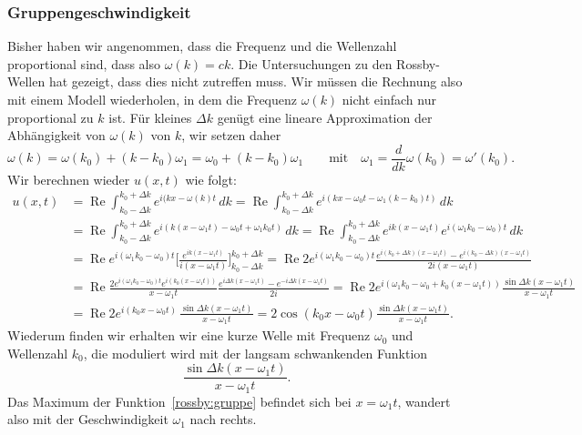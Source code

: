 \subsubsection{Gruppengeschwindigkeit}
%
Bisher haben wir angenommen, dass die Frequenz und die Wellenzahl proportional
sind, dass also $\omega(k)=ck$.
Die Untersuchungen zu den Rossby-Wellen hat gezeigt, dass dies nicht
zutreffen muss.
Wir müssen die Rechnung also mit einem Modell wiederholen, in dem die
Frequenz $\omega(k)$ nicht einfach nur proportional zu $k$ ist.
Für kleines $\Delta k$ genügt eine lineare Approximation der
Abhängigkeit von $\omega(k)$ von $k$, wir setzen daher
\begin{equation}
\omega(k)
=
\omega(k_0) + (k-k_0)\omega_1
=
\omega_0 + (k-k_0)\omega_1
\qquad
\text{mit}
\quad
\omega_1 = \frac{d}{dk}\omega(k_0) = \omega'(k_0).
\end{equation}
Wir berechnen wieder $u(x,t)$ wie folgt:
\begin{align*}
u(x,t)
&=
\operatorname{Re}
\int_{k_0-\Delta k}^{k_0+\Delta k}
e^{i(kx-\omega(k)t}\,dk
=
\operatorname{Re}
\int_{k_0-\Delta k}^{k_0+\Delta k}
e^{i(kx-\omega_0t -\omega_1(k-k_0)t)}
\,dk
\\
&=
\operatorname{Re}
\int_{k_0-\Delta k}^{k_0+\Delta k}
e^{i(k(x-\omega_1 t)-\omega_0t +\omega_1k_0t)}
\,dk
=
\operatorname{Re}
\int_{k_0-\Delta k}^{k_0+\Delta k}
e^{ik(x-\omega_1 t)}
e^{i(\omega_1k_0-\omega_0)t}
\,dk
\\
&=
\operatorname{Re}
e^{i(\omega_1k_0-\omega_0)t}
\biggl[
\frac{e^{ik(x-\omega_1 t)}}{i(x-\omega_1 t)}
\biggr]_{k_0-\Delta k}^{k_0+\Delta k}
=
\operatorname{Re}
2e^{i(\omega_1k_0-\omega_0)t}
\frac{
e^{i(k_0+\Delta k)(x-\omega_1 t)}
-
e^{i(k_0-\Delta k)(x-\omega_1 t)}
}{2i(x-\omega_1 t)}
\\
&=
\operatorname{Re}
\frac{2e^{i(\omega_1k_0-\omega_0)t}e^{i(k_0(x-\omega_1 t))}}{x-\omega_1 t}
\frac{
e^{i\Delta k(x-\omega_1 t)}
-
e^{-i\Delta k(x-\omega_1 t)}
}{2i}
=
\operatorname{Re}
2e^{i(\omega_1k_0-\omega_0+k_0(x-\omega_1 t))}
\frac{\sin \Delta k(x-\omega_1t)}{x-\omega_1 t}
\\
&=
\operatorname{Re}
2e^{i(k_0x-\omega_0t)}\,
\frac{\sin \Delta k(x-\omega_1t)}{x-\omega_1 t}
=
2\cos(k_0x-\omega_0t)
\frac{\sin \Delta k(x-\omega_1t)}{x-\omega_1 t}.
\end{align*}
Wiederum finden wir erhalten wir eine kurze Welle mit Frequenz
$\omega_0$ und Wellenzahl $k_0$, die moduliert wird mit der langsam
schwankenden Funktion
\begin{equation}
\frac{\sin\Delta k(x-\omega_1t)}{x-\omega_1 t}.
\label{rossby:gruppe}
\end{equation}
Das Maximum der Funktion~\eqref{rossby:gruppe}
befindet sich bei $x=\omega_1 t$, wandert also mit der
Geschwindigkeit $\omega_1$ nach rechts.

